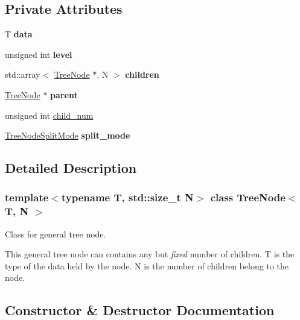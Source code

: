 \subsection*{Private Attributes}
\begin{DoxyCompactItemize}
\item 
\mbox{\label{classTreeNode_af44009d5463e65cc0e2d33223b849372}} 
T {\bfseries data}
\item 
\mbox{\label{classTreeNode_a14271b0c2f081e59bb268a9989b3b1af}} 
unsigned int {\bfseries level}
\item 
\mbox{\label{classTreeNode_a27778d09f91e69ac9847d7910b1c2da7}} 
std\+::array$<$ \hyperlink{classTreeNode}{Tree\+Node} $\ast$, N $>$ {\bfseries children}
\item 
\mbox{\label{classTreeNode_aa3771a67ab22185807e8d7a1643ac1c4}} 
\hyperlink{classTreeNode}{Tree\+Node} $\ast$ {\bfseries parent}
\item 
unsigned int \hyperlink{classTreeNode_a9fc9333a3e4e05ae878a844370c17888}{child\+\_\+num}
\item 
\mbox{\label{classTreeNode_ad4c2701845efda6aedd8433cfc0ce363}} 
\hyperlink{tree_8h_a922ca07db9633957939f697a65aff11d}{Tree\+Node\+Split\+Mode} {\bfseries split\+\_\+mode}
\end{DoxyCompactItemize}


\subsection{Detailed Description}
\subsubsection*{template$<$typename T, std\+::size\+\_\+t N$>$\newline
class Tree\+Node$<$ T, N $>$}

Class for general tree node. 

This general tree node can contains any but {\itshape fixed} number of children. {\ttfamily T} is the type of the data held by the node. {\ttfamily N} is the number of children belong to the node. 

\subsection{Constructor \& Destructor Documentation}
\mbox{\label{classTreeNode_a0cd82abd44bd197539bbd045aeef30d1}} 

